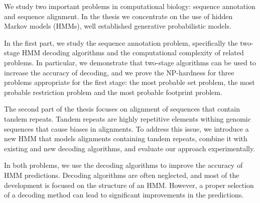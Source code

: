 We study two important problems in computational biology:  sequence
annotation and  sequence alignment. In the thesis we concentrate on the use of hidden Markov
models (HMMs), well established generative probabilistic models.  

In the first part, we study the sequence annotation problem, specifically the
two-stage HMM decoding algorithms and the computational complexity of related problems. In
particular, we demonstrate that two-stage algorithms can be used to increase
the accuracy of decoding, and we prove the NP-hardness for three
problems appropriate for the first stage: the most probable set problem, the most probable restriction problem
and the most probable footprint problem.

The second part of the thesis focuses on  alignment of sequences that contain
tandem repeats. Tandem repeats are highly repetitive elements withing genomic
sequences that cause biases in alignments. To address this issue, we introduce
a new HMM that models alignments containing tandem repeats, combine it with
existing and new decoding algorithms, and evaluate our approach experimentally.

In both problems, we use the decoding algorithms to improve the accuracy of
HMM predictions. Decoding algorithms are often neglected, and most of
the development is focused on the structure of an HMM. However, a proper
selection of a decoding method can lead to significant improvements in the
predictions.
